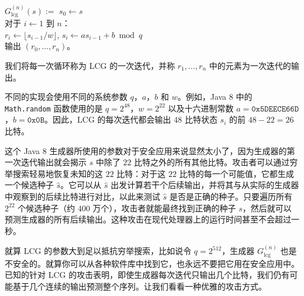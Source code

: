 \hspace*{5pt} $G_\mathrm{lcg}^{(n)}(s):=$
\hspace*{20pt} $s_0\leftarrow s$\\
\hspace*{100pt} 对于 $i\leftarrow 1$ 到 $n$：\\
\hspace*{100pt} \quad\quad\quad
$r_i\leftarrow\lfloor s_{i-1}/w \rfloor$,
\quad
$s_i\leftarrow as_{i-1}+b\bmod q$\\
\hspace*{100pt} 输出 $(r_0,\dots,r_n)$。

\vspace*{10pt}

\noindent
我们将每一次循环称为 LCG 的一次迭代，并称 $r_1,\dots,r_n$ 中的元素为一次迭代的输出。

不同的实现会使用不同的系统参数 $q$，$a$，$b$ 和 $w$。例如，Java 8 中的 \texttt{Math.random} 函数使用的是 $q=2^{48}$，$w=2^{22}$ 以及十六进制常数 $a=\texttt{0x5DEECE66D}$，$b=\texttt{0x0B}$。因此，LCG 的每次迭代都会输出 $48$ 比特状态 $s_i$ 的前 $48-22=26$ 比特。

这个 Java 8 生成器所使用的参数对于安全应用来说显然太小了，因为生成器的第一次迭代输出就会揭示 $s$ 中除了 $22$ 比特之外的所有其他比特。攻击者可以通过穷举搜索轻易地恢复未知的这 $22$ 比特：对于这 $22$ 比特的每一个可能值，它都生成一个候选种子 $\hat s$。它可以从 $\hat s$ 出发计算若干个后续输出，并将其与从实际的生成器中观察到的后续比特进行对比，以此来测试 $\hat s$ 是否是正确的种子。只要遍历所有 $2^{22}$ 个候选种子（约 $400$ 万个），攻击者就能最终找到正确的种子 $s$，然后就可以预测生成器的所有后续输出。这种攻击在现代处理器上的运行时间甚至不会超过一秒。

就算 LCG 的参数大到足以抵抗穷举搜索，比如说令 $q=2^{512}$，生成器 $G_\mathrm{lcg}^{(n)}$ 也是不安全的。就算你可以从各种软件库中找到它，也永远不要把它用在安全应用中。已知的针对 LCG 的攻击表明，即使生成器每次迭代只输出几个比特，我们仍有可能基于几个连续的输出预测整个序列。让我们看看一种优雅的攻击方式。

